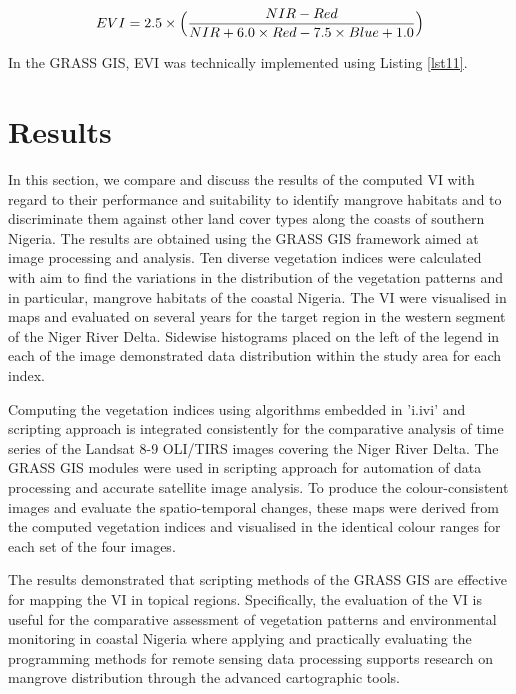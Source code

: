 \documentclass[jmse,article,submit,pdftex,moreauthors]{Definitions/mdpi}
\begin{document}
\begin{equation}\label{eq13}
EVI = 2.5 \times \Bigl(\frac{NIR - Red}{NIR + 6.0 \times Red - 7.5 \times Blue + 1.0}\Bigr)
\end{equation} 

In the GRASS GIS, EVI was technically implemented using Listing \ref{lst11}.

\section{Results}

In this section, we compare and discuss the results of the computed VI with regard to their performance and suitability to identify mangrove habitats and to discriminate them against other land cover types along the coasts of southern Nigeria. The results are obtained using the GRASS GIS framework aimed at image processing and analysis. Ten diverse vegetation indices were calculated with aim to find the variations in the distribution of the vegetation patterns and in particular, mangrove habitats of the coastal Nigeria. The VI were visualised in maps and evaluated on several years for the target region in the western segment of the Niger River Delta. Sidewise histograms placed on the left of the legend in each of the image demonstrated data distribution within the study area for each index. 

Computing the vegetation indices using algorithms embedded in 'i.ivi' and scripting approach is integrated consistently for the comparative analysis of time series of the Landsat 8-9 OLI/TIRS images covering the Niger River Delta. The GRASS GIS modules were used in scripting approach for automation of data processing and accurate satellite image analysis. To produce the colour-consistent images and evaluate the spatio-temporal changes, these maps were derived from the computed vegetation indices and visualised in the identical colour ranges for each set of the four images. 

The results demonstrated that scripting methods of the GRASS GIS are effective for mapping the VI in topical regions. Specifically, the evaluation of the VI is useful for the comparative assessment of vegetation patterns and environmental monitoring in coastal Nigeria where applying and practically evaluating the programming methods for remote sensing data processing supports research on mangrove distribution through the advanced cartographic tools. 

\end{document}
